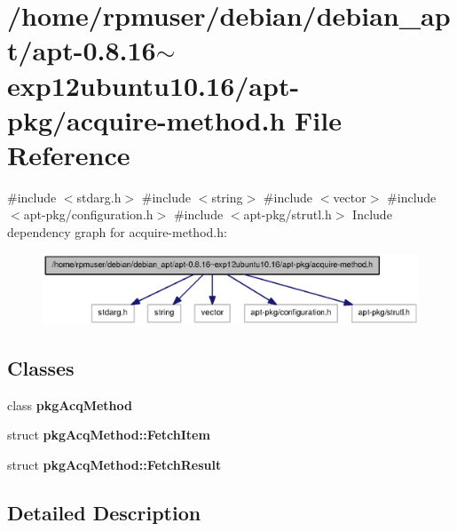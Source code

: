 \section{/home/rpmuser/debian/debian\-\_\-apt/apt-\/0.8.16$\sim$exp12ubuntu10.16/apt-\/pkg/acquire-\/method.h \-File \-Reference}
\label{acquire-method_8h}
{\ttfamily \#include $<$stdarg.\-h$>$}\*
{\ttfamily \#include $<$string$>$}\*
{\ttfamily \#include $<$vector$>$}\*
{\ttfamily \#include $<$apt-\/pkg/configuration.\-h$>$}\*
{\ttfamily \#include $<$apt-\/pkg/strutl.\-h$>$}\*
\-Include dependency graph for acquire-\/method.h\-:
\nopagebreak
\begin{figure}[H]
\begin{center}
\leavevmode
\includegraphics[width=350pt]{acquire-method_8h__incl}
\end{center}
\end{figure}
\subsection*{\-Classes}
\begin{DoxyCompactItemize}
\item 
class {\bf pkg\-Acq\-Method}
\item 
struct {\bf pkg\-Acq\-Method\-::\-Fetch\-Item}
\item 
struct {\bf pkg\-Acq\-Method\-::\-Fetch\-Result}
\end{DoxyCompactItemize}


\subsection{\-Detailed \-Description}
